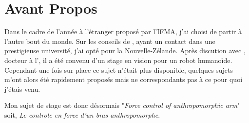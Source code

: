 \section*{Avant Propos}

Dans le cadre de l'ann\'ee \`a l'\'etranger propos\'e par l'IFMA, j'ai choisi de partir \`a l'autre bout du monde.
Sur les conseils de \chedli, ayant un contact dans une prestigieuse universit\'e, j'ai opt\'e pour la Nouvelle-Z\'elande. 
Apr\`es discution avec \rory, docteur \`a l'\umassey , il a \'et\'e convenu d'un stage en vision pour un robot humano\"{\i}de. 
Cependant une fois sur place ce sujet n'\'etait plus disponible, quelques sujets m'ont alors \'et\'e rapidement propos\'es mais ne correspondants pas \`a ce pour quoi j'\'etais venu.

Mon sujet de stage est donc d\'esormais "\emph{Force control of anthropomorphic arm}" soit, \emph{Le controle en force d'un bras anthropomorphe}.
